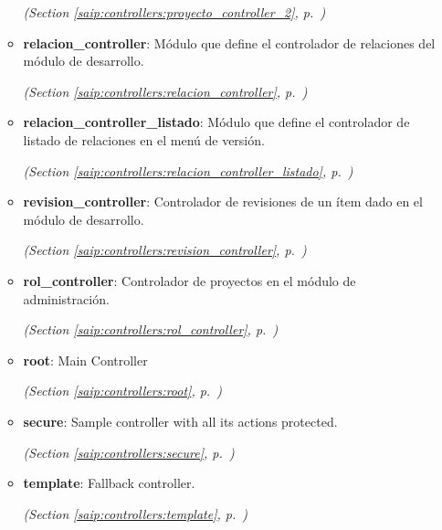 \begin{itemize}
\begin{itemize}
  \textit{(Section \ref{saip:controllers:proyecto_controller_2}, p.~\pageref{saip:controllers:proyecto_controller_2})}

    \item \textbf{relacion\_controller}: Módulo que define el controlador de relaciones del módulo de desarrollo.



  \textit{(Section \ref{saip:controllers:relacion_controller}, p.~\pageref{saip:controllers:relacion_controller})}

    \item \textbf{relacion\_controller\_listado}: Módulo que define el controlador de listado de relaciones en el menú de 
versión.



  \textit{(Section \ref{saip:controllers:relacion_controller_listado}, p.~\pageref{saip:controllers:relacion_controller_listado})}

    \item \textbf{revision\_controller}: Controlador de revisiones de un ítem dado en el módulo de desarrollo.



  \textit{(Section \ref{saip:controllers:revision_controller}, p.~\pageref{saip:controllers:revision_controller})}

    \item \textbf{rol\_controller}: Controlador de proyectos en el módulo de administración.



  \textit{(Section \ref{saip:controllers:rol_controller}, p.~\pageref{saip:controllers:rol_controller})}

    \item \textbf{root}: Main Controller



  \textit{(Section \ref{saip:controllers:root}, p.~\pageref{saip:controllers:root})}

    \item \textbf{secure}: Sample controller with all its actions protected.



  \textit{(Section \ref{saip:controllers:secure}, p.~\pageref{saip:controllers:secure})}

    \item \textbf{template}: Fallback controller.



  \textit{(Section \ref{saip:controllers:template}, p.~\pageref{saip:controllers:template})}


\end{itemize}
\end{itemize}
